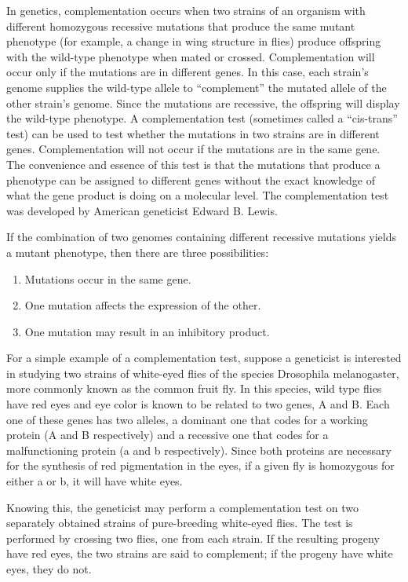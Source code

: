 In genetics, complementation occurs when two strains of an organism with different homozygous recessive mutations that produce the same mutant phenotype (for example, a change in wing structure in flies) produce offspring with the wild-type phenotype when mated or crossed. Complementation will occur only if the mutations are in different genes. In this case, each strain's genome supplies the wild-type allele to ``complement'' the mutated allele of the other strain's genome. Since the mutations are recessive, the offspring will display the wild-type phenotype. A complementation test (sometimes called a ``cis-trans'' test) can be used to test whether the mutations in two strains are in different genes. Complementation will not occur if the mutations are in the same gene. The convenience and essence of this test is that the mutations that produce a phenotype can be assigned to different genes without the exact knowledge of what the gene product is doing on a molecular level. The complementation test was developed by American geneticist Edward B. Lewis.

If the combination of two genomes containing different recessive mutations yields a mutant phenotype, then there are three possibilities:

\begin{enumerate}
\def\labelenumi{\arabic{enumi}.}
\tightlist
\item
  Mutations occur in the same gene.
\item
  One mutation affects the expression of the other.
\item
  One mutation may result in an inhibitory product.
\end{enumerate}

For a simple example of a complementation test, suppose a geneticist is interested in studying two strains of white-eyed flies of the species Drosophila melanogaster, more commonly known as the common fruit fly. In this species, wild type flies have red eyes and eye color is known to be related to two genes, A and B. Each one of these genes has two alleles, a dominant one that codes for a working protein (A and B respectively) and a recessive one that codes for a malfunctioning protein (a and b respectively). Since both proteins are necessary for the synthesis of red pigmentation in the eyes, if a given fly is homozygous for either a or b, it will have white eyes.

Knowing this, the geneticist may perform a complementation test on two separately obtained strains of pure-breeding white-eyed flies. The test is performed by crossing two flies, one from each strain. If the resulting progeny have red eyes, the two strains are said to complement; if the progeny have white eyes, they do not.

